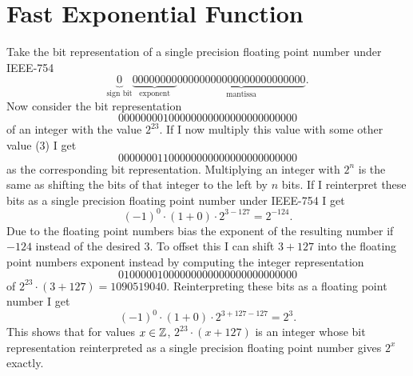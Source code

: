 \documentclass[a4paper, 11pt]{memoir}
\begin{document}
    \section{Fast Exponential Function}
    \label{sec:fast_exp_explanation}
    Take the bit representation of a single precision floating point number under IEEE-754
    \begin{equation}
        \underbrace{0}_{\text{sign bit}}\underbrace{00000000}_{\text{exponent}}\underbrace{00000000000000000000000}_{\text{mantissa}}.
    \end{equation}
    Now consider the bit representation
    \begin{equation}
        00000000100000000000000000000000
    \end{equation}
    of an integer with the value $2^{23}$. If I now multiply this value with some other value (\eg $3$) I get
    \begin{equation}
        00000001100000000000000000000000
    \end{equation}
    as the corresponding bit representation. Multiplying an integer with $2^n$ is the same as shifting the bits of that
    integer to the left by $n$ bits. If I reinterpret these bits as a single precision floating point number under
    IEEE-754 I get
    \begin{equation}
        (-1)^0 \cdot (1 + 0) \cdot 2^{3 - 127} = 2^{-124}.
    \end{equation}
    Due to the floating point numbers bias the exponent of the resulting number if $-124$ instead of the desired $3$. To
    offset this I can shift $3 + 127$ into the floating point numbers exponent instead by computing the integer
    representation
    \begin{equation}
        01000001000000000000000000000000
    \end{equation}
    of $2^{23}\cdot(3 + 127) = 1090519040$. Reinterpreting these bits as a floating point number I get
    \begin{equation}
        (-1)^0 \cdot (1 + 0) \cdot 2^{3 + 127 - 127} = 2^3.
    \end{equation}
    This shows that for values $x \in \mathbb{Z}$, $2^{23}\cdot(x + 127)$ is an integer whose bit representation reinterpreted
    as a single precision floating point number gives $2^x$ exactly.
\end{document}

